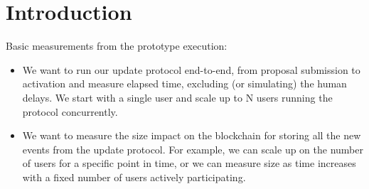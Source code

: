 \section{Introduction}
Basic measurements from the prototype execution:

\begin{itemize}
\item We want to run our update protocol end-to-end, from proposal submission to activation and measure elapsed time, excluding (or simulating) the human delays. We start with a single user and scale up to N users running the protocol concurrently.

\item We want to measure the size impact on the blockchain for storing all the new events from the update protocol. For example, we can scale up on the number of users for a specific point in time, or we can measure size as time increases with a fixed number of users actively participating. 

\end{itemize}
